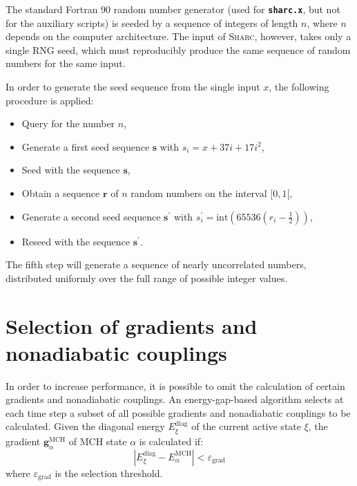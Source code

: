 \documentclass[a4paper,10pt,DIV=15,openany,twoside=false]{scrbook}
\newcommand{\sharc}{\textsc{Sharc}}
\newcommand{\ttt}[1]{\textbf{\texttt{#1}}}
\newcommand{\VEC}[1]{\ensuremath{\mathbf{#1}}}
\begin{document}
The standard Fortran 90 random number generator (used for \ttt{sharc.x}, but not for the auxiliary scripts) is seeded by a sequence of integers of length $n$, where $n$ depends on the computer architecture. The input of \sharc, however, takes only a single RNG seed, which must reproducibly produce the same sequence of random numbers for the same input.

In order to generate the seed sequence from the single input $x$, the following procedure is applied:
\begin{itemize}
  \item Query for the number $n$,
  \item Generate a first seed sequence $\VEC{s}$ with $s_i=x+37i+17i^2$,
  \item Seed with the sequence $\VEC{s}$,
  \item Obtain a sequence $\VEC{r}$ of $n$ random numbers on the interval $[0,1[$,
  \item Generate a second seed sequence $\VEC{s}^\prime$ with $s_i^\prime=\text{int}\left(65536(r_i-\frac{1}{2})\right)$,
  \item Reseed with the sequence $\VEC{s}^\prime$.
\end{itemize}
The fifth step will generate a sequence of nearly uncorrelated numbers, distributed uniformly over the full range of possible integer values. 


\section{Selection of gradients and nonadiabatic couplings}\label{met:selection}

In order to increase performance, it is possible to omit the calculation of certain gradients and nonadiabatic couplings. An energy-gap-based algorithm selects at each time step a subset of all possible gradients and nonadiabatic couplings to be calculated. Given the diagonal energy $E^{\text{diag}}_\xi$ of the current active state $\xi$, the gradient $\VEC{g}^{\text{MCH}}_\alpha$ of MCH state $\alpha$ is calculated if:
\begin{equation}
  \left|
    E^{\text{diag}}_\xi - E^{\text{MCH}}_\alpha
  \right|
  <
  \varepsilon_\text{grad}
\end{equation}
where $\varepsilon_\text{grad}$ is the selection threshold.
\end{document}
